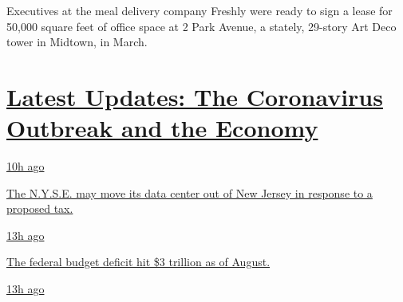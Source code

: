 Executives at the meal delivery company Freshly were ready to sign a
lease for 50,000 square feet of office space at 2 Park Avenue, a
stately, 29-story Art Deco tower in Midtown, in March.

\hypertarget{latest-updates-the-coronavirus-outbreak-and-the-economy}{%
\section{\texorpdfstring{\href{https://www.nytimes3xbfgragh.onion/live/2020/09/11/business/stock-market-today-coronavirus?action=click\&pgtype=Article\&state=default\&region=MAIN_CONTENT_1\&context=storylines_live_updates}{Latest
Updates: The Coronavirus Outbreak and the
Economy}}{Latest Updates: The Coronavirus Outbreak and the Economy}}\label{latest-updates-the-coronavirus-outbreak-and-the-economy}}

\href{https://www.nytimes3xbfgragh.onion/live/2020/09/11/business/stock-market-today-coronavirus?action=click\&pgtype=Article\&state=default\&region=MAIN_CONTENT_1\&context=storylines_live_updates\#the-nyse-may-move-its-data-center-out-of-new-jersey-in-response-to-a-proposed-tax}{10h
ago}

\href{https://www.nytimes3xbfgragh.onion/live/2020/09/11/business/stock-market-today-coronavirus?action=click\&pgtype=Article\&state=default\&region=MAIN_CONTENT_1\&context=storylines_live_updates\#the-nyse-may-move-its-data-center-out-of-new-jersey-in-response-to-a-proposed-tax}{The
N.Y.S.E. may move its data center out of New Jersey in response to a
proposed tax.}

\href{https://www.nytimes3xbfgragh.onion/live/2020/09/11/business/stock-market-today-coronavirus?action=click\&pgtype=Article\&state=default\&region=MAIN_CONTENT_1\&context=storylines_live_updates\#the-federal-budget-deficit-hit-3-trillion-as-of-august}{13h
ago}

\href{https://www.nytimes3xbfgragh.onion/live/2020/09/11/business/stock-market-today-coronavirus?action=click\&pgtype=Article\&state=default\&region=MAIN_CONTENT_1\&context=storylines_live_updates\#the-federal-budget-deficit-hit-3-trillion-as-of-august}{The
federal budget deficit hit \$3 trillion as of August.}

\href{https://www.nytimes3xbfgragh.onion/live/2020/09/11/business/stock-market-today-coronavirus?action=click\&pgtype=Article\&state=default\&region=MAIN_CONTENT_1\&context=storylines_live_updates\#warner-bros-pushes-the-release-of-wonder-woman-1984-to-christmas}{13h
ago}

